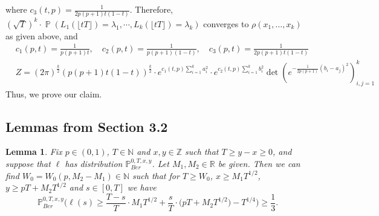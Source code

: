 \documentclass[12pt]{article}
\newtheorem{lemma}{Lemma}
\DeclareMathOperator{\pr}{\mathbb{P}}
\begin{document}
where $c_{3}(t,p)=\frac{1}{2p(p+1)t(1-t)}$.
Therefore, $(\sqrt{T})^{k}\cdot\pr(L_1(\lfloor tT\rfloor)=\lambda_1,\cdots, L_k(\lfloor tT\rfloor)=\lambda_k)$ converges to $\rho(x_{1},\dots,x_{k})$ as given above, and 
\begin{align*}
	&c_{1}(p,t)=\frac{1}{p(p+1)t}, \quad c_{2}(p,t)=\frac{1}{p(p+1)(1-t)}, \quad c_{3}(p,t)=\frac{1}{2p(p+1)t(1-t)}\\
	&Z=(2\pi)^{\frac{k}{2}}(p(p+1)t(1-t))^{\frac{k}{2}}\cdot e^{c_{1}(t,p)\sum_{i=1}^{k}a_{i}^{2}}\cdot e^{c_{2}(t,p)\sum_{i=1}^{k}b_{i}^{2}}\det\left(e^{-\frac{1}{2p(p+1)}(b_{i}-a_{j})^{2}}\right)_{i,j=1}^{k}
\end{align*}
Thus, we prove our claim. 



	\subsection*{Lemmas from Section 3.2}
	
	\begin{lemma}\label{LemmaHalfS4} Fix $p \in (0,1)$, $T \in \mathbb{N}$ and $x, y\in \mathbb{Z}$ such that $T \geq y-x \geq 0$, and suppose that $\ell$ has distribution $\mathbb{P}^{0,T,x,y}_{Ber}$. Let $M_1, M_2 \in \mathbb{R}$ be given. Then we can find $W_0 = W_0(p,M_2 - M_1) \in \mathbb{N}$ such that for $T \geq W_0$, $x \geq M_1 T^{1/2}$, $y \geq pT + M_2 T^{1/2}$ and $s \in [0,T]$ we have
		\begin{equation}\label{halfEq1S4}
		\mathbb{P}^{0,T,x,y}_{Ber}\Big( \ell(s)  \geq \frac{T-s}{T} \cdot M_1 T^{1/2} + \frac{s}{T} \cdot \big(p T + M_2 T^{1/2}\big) - T^{1/4} \Big) \geq \frac{1}{3}.
		\end{equation}
	\end{lemma}
\end{document}
